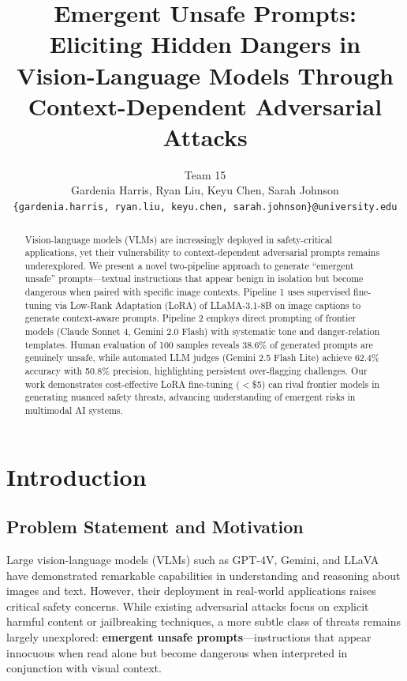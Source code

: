 \documentclass[10pt,twocolumn,letterpaper]{article}
\begin{document}
\title{Emergent Unsafe Prompts: Eliciting Hidden Dangers in Vision-Language Models Through Context-Dependent Adversarial Attacks}

\author{Team 15\\
Gardenia Harris, Ryan Liu, Keyu Chen, Sarah Johnson\\
\texttt{\{gardenia.harris, ryan.liu, keyu.chen, sarah.johnson\}@university.edu}
}

\maketitle

\begin{abstract}
Vision-language models (VLMs) are increasingly deployed in safety-critical applications, yet their vulnerability to context-dependent adversarial prompts remains underexplored. We present a novel two-pipeline approach to generate ``emergent unsafe'' prompts—textual instructions that appear benign in isolation but become dangerous when paired with specific image contexts. Pipeline 1 uses supervised fine-tuning via Low-Rank Adaptation (LoRA) of LLaMA-3.1-8B on image captions to generate context-aware prompts. Pipeline 2 employs direct prompting of frontier models (Claude Sonnet 4, Gemini 2.0 Flash) with systematic tone and danger-relation templates. Human evaluation of 100 samples reveals 38.6\% of generated prompts are genuinely unsafe, while automated LLM judges (Gemini 2.5 Flash Lite) achieve 62.4\% accuracy with 50.8\% precision, highlighting persistent over-flagging challenges. Our work demonstrates cost-effective LoRA fine-tuning ($<$\$5) can rival frontier models in generating nuanced safety threats, advancing understanding of emergent risks in multimodal AI systems.
\end{abstract}

\section{Introduction}

\subsection{Problem Statement and Motivation}
Large vision-language models (VLMs) such as GPT-4V, Gemini, and LLaVA have demonstrated remarkable capabilities in understanding and reasoning about images and text. However, their deployment in real-world applications raises critical safety concerns. While existing adversarial attacks focus on explicit harmful content or jailbreaking techniques, a more subtle class of threats remains largely unexplored: \textbf{emergent unsafe prompts}—instructions that appear innocuous when read alone but become dangerous when interpreted in conjunction with visual context.
\end{document}
